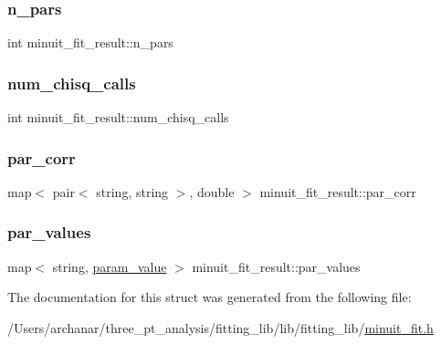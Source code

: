 \mbox{\label{structminuit__fit__result_ad354d3db663e564286ac7bf58c9422ac}} 
\subsubsection{\texorpdfstring{n\_pars}{n\_pars}}
{\footnotesize\ttfamily int minuit\+\_\+fit\+\_\+result\+::n\+\_\+pars}

\mbox{\label{structminuit__fit__result_a83f32419135a0b919dd40dcdf0733e8a}} 
\subsubsection{\texorpdfstring{num\_chisq\_calls}{num\_chisq\_calls}}
{\footnotesize\ttfamily int minuit\+\_\+fit\+\_\+result\+::num\+\_\+chisq\+\_\+calls}

\mbox{\label{structminuit__fit__result_ac3d69b03a0dd160c3f94cd04207c7fac}} 
\subsubsection{\texorpdfstring{par\_corr}{par\_corr}}
{\footnotesize\ttfamily map$<$ pair$<$ string, string $>$, double $>$ minuit\+\_\+fit\+\_\+result\+::par\+\_\+corr}

\mbox{\label{structminuit__fit__result_a798128e058df3dd530688e2d2038fcb9}} 
\subsubsection{\texorpdfstring{par\_values}{par\_values}}
{\footnotesize\ttfamily map$<$ string, \mbox{\hyperlink{structparam__value}{param\+\_\+value}} $>$ minuit\+\_\+fit\+\_\+result\+::par\+\_\+values}



The documentation for this struct was generated from the following file\+:\begin{DoxyCompactItemize}
\item 
/\+Users/archanar/three\+\_\+pt\+\_\+analysis/fitting\+\_\+lib/lib/fitting\+\_\+lib/\mbox{\hyperlink{lib_2fitting__lib_2minuit__fit_8h}{minuit\+\_\+fit.\+h}}\end{DoxyCompactItemize}
